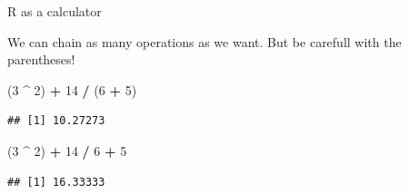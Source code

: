 \documentclass[ignorenonframetext,]{beamer}
\newenvironment{Shaded}{\begin{snugshade}}{\end{snugshade}}
\newcommand{\DecValTok}[1]{\textcolor[rgb]{0.00,0.00,0.81}{#1}}
\newcommand{\NormalTok}[1]{#1}
\newcommand{\OperatorTok}[1]{\textcolor[rgb]{0.81,0.36,0.00}{\textbf{#1}}}
\newcommand{\StringTok}[1]{\textcolor[rgb]{0.31,0.60,0.02}{#1}}
\begin{document}
\begin{frame}[fragile]{R as a calculator}
\protect\hypertarget{r-as-a-calculator-1}{}

We can chain as many operations as we want. But be carefull with the
parentheses!

\begin{Shaded}
\begin{Highlighting}[]
\NormalTok{(}\DecValTok{3} \OperatorTok{^}\StringTok{ }\DecValTok{2}\NormalTok{) }\OperatorTok{+}\StringTok{ }\DecValTok{14} \OperatorTok{/}\StringTok{ }\NormalTok{(}\DecValTok{6} \OperatorTok{+}\StringTok{ }\DecValTok{5}\NormalTok{)}
\end{Highlighting}
\end{Shaded}

\begin{verbatim}
## [1] 10.27273
\end{verbatim}

\begin{Shaded}
\begin{Highlighting}[]
\NormalTok{(}\DecValTok{3} \OperatorTok{^}\StringTok{ }\DecValTok{2}\NormalTok{) }\OperatorTok{+}\StringTok{ }\DecValTok{14} \OperatorTok{/}\StringTok{ }\DecValTok{6} \OperatorTok{+}\StringTok{ }\DecValTok{5}
\end{Highlighting}
\end{Shaded}

\begin{verbatim}
## [1] 16.33333
\end{verbatim}

\end{frame}
\end{document}
